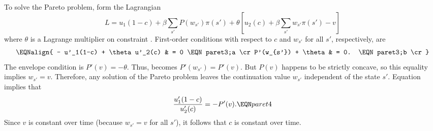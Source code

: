 

To solve the Pareto problem, form the
Lagrangian
$$ L = u_1(1-c) + \beta \sum_{s'} P(w_{s'}) \pi(s')
+ \theta \left[ u_2(c) + \beta \sum_{s'} w_{s'} \pi(s') - v \right] $$
where $\theta $ is a Lagrange multiplier on constraint .
First-order conditions
with respect to $c$ and $w_{s'}$ for all $s'$, respectively, are
$$\EQNalign{ - u'_1(1-c) + \theta u'_2(c) & = 0 \EQN paret3;a \cr
        P'(w_{s'}) + \theta & = 0. \EQN paret3;b \cr} $$
The envelope condition is
$ P'(v) = -\theta$.  Thus,  becomes
$  P'(w_{s'}) = P'(v)   $.  But $P(v)$ happens to be strictly concave,
so  this equality implies
$ w_{s'} = v$.  Therefore,  any solution of the Pareto problem leaves
the continuation value $w_{s'}$ independent  of  the state $s'$.
Equation
 implies that
$${u'_1(1-c) \over u'_2(c)} = -P' (v) .\EQN paret4 $$
Since $v$ is constant over time (because $w_{s'} = v$ 
for all $s'$),
it follows that $c$ is constant over time.





